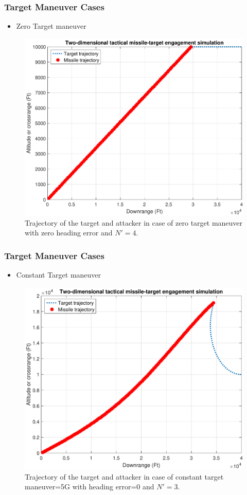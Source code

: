 \documentclass{beamer}
\begin{document}
\begin{frame}
\frametitle{Target Maneuver Cases}
\begin{itemize}
	\item Zero Target maneuver
\end{itemize}
\begin{figure}[H]
	\centering
	\includegraphics[scale = 0.3]{fig/trajectoryXNT0HE0N4.pdf}
	\caption{Trajectory of the target and attacker in case of zero target maneuver with zero heading error and $N'=4$.}
	\label{trajectoryXNT0HE0N4}
\end{figure}
\end{frame}
\begin{frame}
\frametitle{Target Maneuver Cases}
\begin{itemize}
	\item Constant Target maneuver
\end{itemize}
\begin{figure}[htb]
	\centering
	\includegraphics[scale = 0.3]{fig/trajectoryXNT5HE0N3.pdf}
	\caption{Trajectory of the target and attacker in case of constant target maneuver=5G with heading error=0 and $N'=3$.}
	\label{trajectory0NN3}
\end{figure}
\end{frame}
\end{document}
